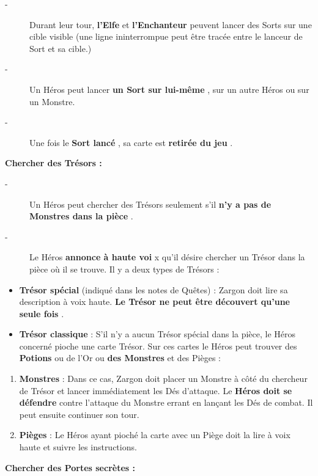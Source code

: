 \documentclass{scrartcl}%
\begin{document}
%
\begin{description}%
\item[{-} ]%
%
 Durant leur tour, %
\textbf{l'Elfe}%
\textit{ }%
 et %
\textbf{l'Enchanteur}%
\textit{ }%
 peuvent lancer des Sorts sur une cible visible (une ligne ininterrompue peut être tracée entre le lanceur de Sort et sa cible.)
%
\item[{-} ]%
%
 Un Héros peut lancer %
\textbf{un Sort sur lui{-}même}%
, sur un autre Héros ou sur un Monstre.
%
\item[{-} ]%
%
 Une fois le %
\textbf{Sort lancé}%
, sa carte est %
\textbf{retirée du jeu}%
.
%
\end{description}%
\textbf{ Chercher des Trésors :}%

%
\begin{description}%
\item[{-} ]%
%
 Un Héros peut chercher des Trésors seulement s'il %
\textbf{n'y a pas de Monstres dans la pièce}%
.
%
\item[{-} ]%
%
 Le Héros %
\textbf{annonce à haute voi}%
x qu'il désire chercher un Trésor dans la pièce où il se trouve. Il y a deux types de Trésors :
%
\end{description}%
\begin{itemize}%
\item%
%
\textbf{Trésor spécial}%
\textit{ }%
 (indiqué dans les notes de Quêtes) : Zargon doit lire sa description à voix haute.%
\textbf{ Le Trésor ne peut être découvert qu'une seule fois}%
.
%
\item%
%
\textbf{Trésor classique}%
\textit{ }%
 : S'il n'y a aucun Trésor spécial dans la pièce, le Héros concerné pioche une carte Trésor. Sur ces cartes le Héros peut trouver des %
\textbf{Potions}%
\textit{ }%
 ou de l'Or ou %
\textbf{des Monstres}%
\textit{ }%
 et des Pièges :
%
\end{itemize}%
\begin{enumerate}%
\item%
%
\textbf{Monstres}%
\textit{ }%
 : Dans ce cas, Zargon doit placer un Monstre à côté du chercheur de Trésor et lancer immédiatement les Dés d'attaque. Le %
\textbf{Héros doit se défendre}%
\textit{ }%
 contre l'attaque du Monstre errant en lançant les Dés de combat. Il peut ensuite continuer son tour.
%
\item%
%
\textbf{Pièges}%
\textit{ }%
 : Le Héros ayant pioché la carte avec un Piège doit la lire à voix haute et suivre les instructions. 
%
\end{enumerate}%
\textbf{Chercher des Portes secrètes :}%
\end{document}
